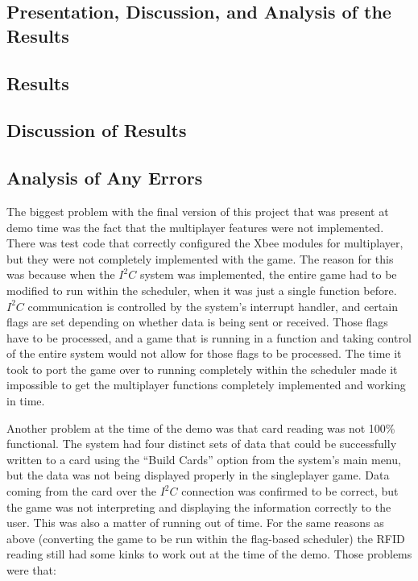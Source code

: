 \documentclass[12pt]{article} %
\begin{document}
\begin{itemize}
\section{Presentation, Discussion, and Analysis of the Results}
%
%
\subsection{Results } %

\subsection{Discussion of Results } %

\subsection{Analysis of Any Errors } %
%

The biggest problem with the final version of this project that was present at
demo time was the fact that the multiplayer features were not implemented.
There was test code that correctly configured the Xbee modules for multiplayer,
but they were not completely implemented with the game.  The reason for this
was because when the $I^2C$ system was implemented, the entire game had to be
modified to run within the scheduler, when it was just a single function
before.  $I^2C$ communication is controlled by the system's interrupt handler,
and certain flags are set depending on whether data is being sent or received.
Those flags have to be processed, and a game that is running in a function and
taking control of the entire system would not allow for those flags to be
processed.  The time it took to port the game over to running completely within
the scheduler made it impossible to get the multiplayer functions completely
implemented and working in time.

Another problem at the time of the demo was that card reading was not 100\%
functional.  The system had four distinct sets of data that could be
successfully written to a card using the ``Build Cards'' option from the
system's main menu, but the data was not being displayed properly in the
singleplayer game.  Data coming from the card over the $I^2C$ connection was
confirmed to be correct, but the game was not interpreting and displaying the
information correctly to the user.  This was also a matter of running out of
time.  For the same reasons as above (converting the game to be run within the
flag-based scheduler) the RFID reading still had some kinks to work out at the
time of the demo.  Those problems were that:


\end{itemize}
\end{document}
